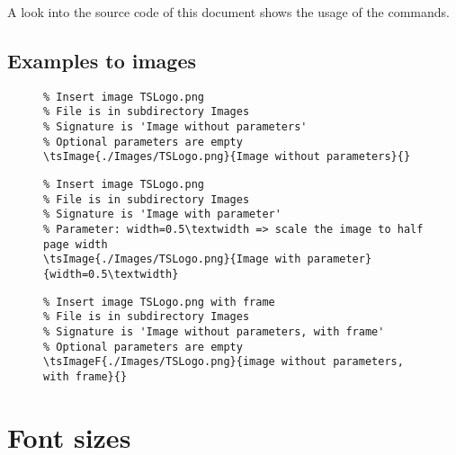 A look into the source code of this document shows the usage of the commands.

\subsection{Examples to images}

\begin{figure}[H]
    \small
    \centering
    \begin{BVerbatim}
\tsImage{./Images/TSLogo.png}{Image without parameters}{}
    \end{BVerbatim}
\end{figure}


\begin{figure}[H]
    \small
    \centering
    \begin{BVerbatim}
\tsImage{./Images/TSLogo.png}{Image with parameter}{width=0.5\textwidth}
    \end{BVerbatim}
\end{figure}


\begin{figure}[H]
    \small
    \centering
    \begin{BVerbatim}
\tsImageF{./Images/TSLogo.png}{image without parameters, with frame}{}
    \end{BVerbatim}
\end{figure}


\section{Font sizes}
\label{sec:Font sizes}

